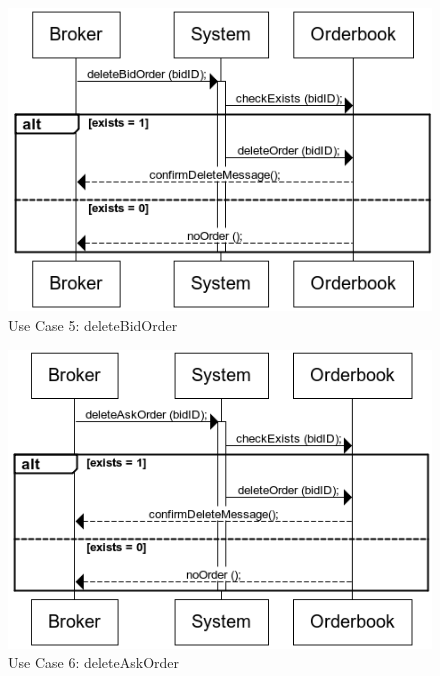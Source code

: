 \documentclass[a4paper]{article}
\begin{document}
\begin{figure}
  \caption{Use Case 5: deleteBidOrder}
  \centering
    \includegraphics[width=1\textwidth]{deleteBidOrder}
\end{figure}

\begin{figure}
  \caption{Use Case 6: deleteAskOrder}
  \centering
    \includegraphics[width=1\textwidth]{deleteAskOrder}
\end{figure}
\end{document}
